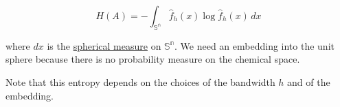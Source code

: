 \[ H(A) = -\int_\mathbb{{S}^n}  \hat{f}_h(x)\log  \hat{f}_h(x) \,dx  \]



where $dx$ is the \href{https://en.wikipedia.org/wiki/Spherical_measure}{spherical measure} on $\mathbb{{S}^n}$. We need an embedding into the unit sphere because there is no probability measure on the chemical space.

Note that this entropy depends on the choices of the bandwidth $h$ and of the embedding.
